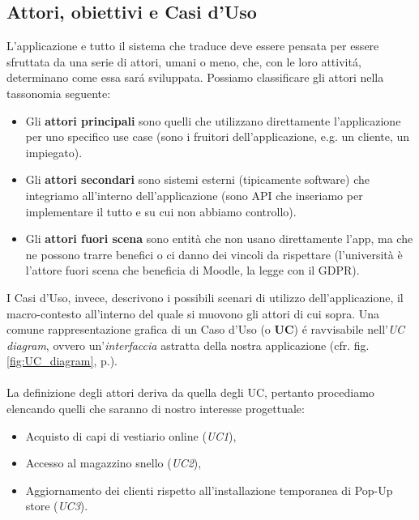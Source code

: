 \documentclass[12pt]{article}
\begin{document}
\subsection{Attori, obiettivi e Casi d'Uso}
\label{subsec:UC}

L'applicazione e tutto il sistema che traduce deve essere pensata per essere sfruttata da una serie di attori, umani o meno, che, con le loro attivit\'a, determinano come essa sar\'a sviluppata. Possiamo classificare gli attori nella tassonomia seguente:
\begin{itemize}
    \item Gli \textbf{attori principali} sono quelli che utilizzano direttamente l’applicazione per uno specifico use case (sono i fruitori dell’applicazione, e.g. un cliente, un impiegato).
    \item Gli \textbf{attori secondari} sono sistemi esterni (tipicamente software) che integriamo all’interno dell’applicazione (sono API che inseriamo per implementare il tutto e su cui non abbiamo controllo).
    \item Gli \textbf{attori fuori scena} sono entità che non usano direttamente l’app, ma che ne possono trarre benefici o ci danno dei vincoli da rispettare (l’università è l’attore fuori scena che beneficia di Moodle, la legge con il GDPR).
\end{itemize}

I Casi d'Uso, invece, descrivono i possibili scenari di utilizzo dell'applicazione, il macro-contesto all'interno del quale si muovono gli attori di cui sopra. Una comune rappresentazione grafica di un Caso d'Uso (o \textbf{UC}) \'e ravvisabile nell'{\em UC diagram}, ovvero un'\textit{interfaccia} astratta della nostra applicazione (cfr. fig. \ref{fig:UC_diagram}, p.\pageref{fig:UC_diagram}).
\\
\\
La definizione degli attori deriva da quella degli UC, pertanto procediamo elencando quelli che saranno di nostro interesse progettuale:
\begin{itemize}
    \item Acquisto di capi di vestiario online (\textit{UC1}),
    \item Accesso al magazzino snello (\textit{UC2}),
    \item Aggiornamento dei clienti rispetto all'installazione temporanea di Pop-Up store (\textit{UC3}).
\end{itemize}
\end{document}
